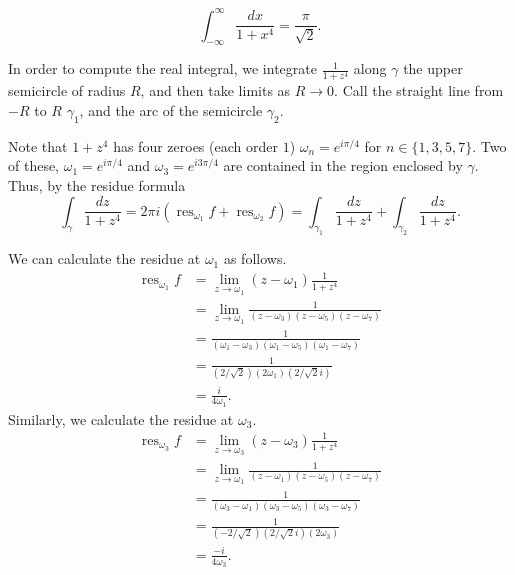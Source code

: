 \documentclass[12 pt, letterpaper]{hmcpset}
\begin{document}
\begin{solution}
	\[
		\boxed{
			\int_{-\infty}^{\infty} \frac{dx}{1 + x^{4}} = \frac{\pi}{\sqrt{2}}.
		}
	\]

	In order to compute the real integral, we integrate $\frac{1}{1 + z^{4}}$ along $\gamma$ the upper semicircle of radius $R$, and then take limits as $R \to 0$. Call the straight line from $-R$ to $R$ $\gamma_{1}$, and the arc of the semicircle $\gamma_{2}$.

	Note that $1 + z^{4}$ has four zeroes (each order $1$) $\omega_{n} = e^{i \pi/4}$ for $n \in \{ 1, 3, 5, 7 \}$. Two of these, $\omega_{1} = e^{i \pi /4}$ and $\omega_{3} = e^{i 3 \pi / 4}$ are contained in the region enclosed by $\gamma$. Thus, by the residue formula
	\[
		\int_{\gamma} \frac{dz}{1 + z^{4}} = 2 \pi i(\operatorname{res}_{\omega_{1}} f + \operatorname{res}_{\omega_{2}} f) = \int_{\gamma_{1}} \frac{dz}{1 + z^{4}} + \int_{\gamma_{2}} \frac{dz}{1 + z^{4}}.
	\]

	We can calculate the residue at $\omega_{1}$ as follows.
	\[
		\begin{split}
			\operatorname{res}_{\omega_{1}} f & = \lim_{z \to \omega_{1}} (z - \omega_{1}) \frac{1}{1 + z^{4}} \\
							  & = \lim_{z \to \omega_{1}} \frac{1}{(z - \omega_{3})(z - \omega_{5})(z - \omega_{7})} \\
							  & = \frac{1}{(\omega_{1} - \omega_{3})(\omega_{1} - \omega_{5})(\omega_{1} - \omega_{7})} \\
							  & = \frac{1}{(2/\sqrt{2})(2 \omega_{1})(2/\sqrt{2} i)} \\
							  & = \frac{i}{4 \omega_{1}}.
		\end{split}
	\]
	Similarly, we calculate the residue at $\omega_{3}$.
	\[
		\begin{split}
			\operatorname{res}_{\omega_{3}} f & = \lim_{z \to \omega_{3}} (z - \omega_{3}) \frac{1}{1 + z^{4}} \\
							  & = \lim_{z \to \omega_{1}} \frac{1}{(z - \omega_{1})(z - \omega_{5})(z - \omega_{7})} \\
							  & = \frac{1}{(\omega_{3} - \omega_{1})(\omega_{3} - \omega_{5})(\omega_{3} - \omega_{7})} \\
							  & = \frac{1}{(-2/\sqrt{2})(2/\sqrt{2} i)(2 \omega_{3})} \\
							  & = \frac{- i}{4 \omega_{3}}.
		\end{split}
	\]


\end{solution}
\end{document}
